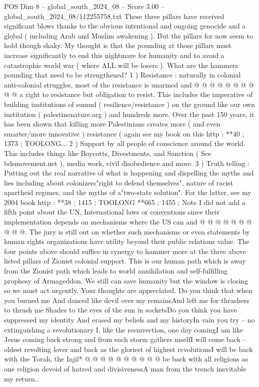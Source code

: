 \begin{textsample}{POS Dim 8 – global\_south\_2024\_08 – Score 3.00 – global\_south\_2024\_08/112255758.txt}
These three pillars have received significant blows thanks to the obvious intentional and ongoing genocide and a global ( including Arab and Muslim awakening ).
But the pillars for now seem to hold though shaky.
My thought is that the pounding at those pillars must increase significantly to end this nightmare for humanity and to avoid a catastrophic world war ( where ALL will be losers ).
What are the hammers pounding that need to be strengthened? 1 ) Resistance : naturally in colonial anti-colonial struggles, most of the resistance is unarmed and @ @ @ @ @ @ @ @ @ @ a right to resistance but obligation to resist.
This includes the imperative of building institutions of sumud ( resilience/resistance ) on the ground like our own institution ( palestinenature.org ) and hundreds more.
Over the past 150 years, it has been shown that killing more Palestinians creates more ( and even smarter/more innovative ) resistance ( again see my book on this http : **40 ; 1373 ; TOOLONG... 2 ) Support by all people of conscience around the world.
This includes things like Boycotts, Divestments, and Sanction ( See bdsmovement.net ), media work, civil disobedience and more. 3 ) Truth telling : Putting out the real narrative of what is happening and dispelling the myths and lies including about colonizers"right to defend themselves", nature of racist apartheid regimes, and the myths of a"two-state solution".
For the latter, see my 2004 book http : **38 ; 1415 ; TOOLONG **665 ; 1455 ; Note I did not add a fifth point about the UN, International laws or conventions since their implementation depends on mechanisms where the US can and @ @ @ @ @ @ @ @ @ @.
The jury is still out on whether such mechanisms or even statements by human rights organizations have utility beyond their public relations value.
The four points above should suffice in synergy to hammer more at the three above listed pillars of Zionist colonial support.
This is our human path which is away from the Zionist path which leads to world annihilation and self-fulfilling prophesy of Armageddon.
We still can save humanity but the window is closing so we must act urgently.
Your thoughts are appreciated.
Do you think that when you burned me And danced like devil over my remainsAnd left me for thrashers to thrash me Shades to the eyes of the sun in socketsDo you think you have suppressed my identity And erased my beliefs and my historyIn vain you try -- no extinguishing a revolutionary I, like the resurrection, one day comingI am like Jesus coming back strong and from each storm gathers mselfI will come back -- oldest revolting lover and back as the gloriest of highest revolutionsI will be back with the Torah, the Injil* @ @ @ @ @ @ @ @ @ @ be back with all religions as one religion devoid of hatred and divisivenessA man from the trench inevitable my return..

\end{textsample}
